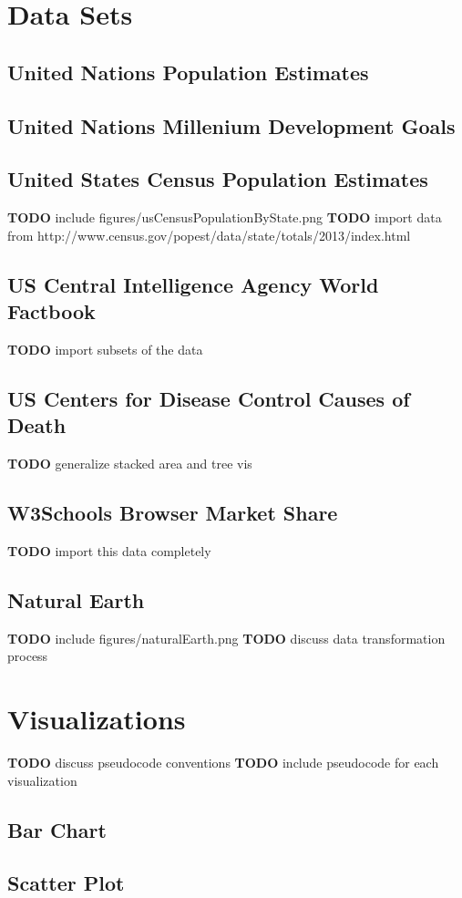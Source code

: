 \documentclass[12pt]{report}
\newcommand{\TODO}[1]{{ \color{red}\textbf{TODO} #1 }}
\begin{document}
\begin{doublespace}
\pagebreak
\section{Data Sets}
\subsection{United Nations Population Estimates}
\subsection{United Nations Millenium Development Goals}
\subsection{United States Census Population Estimates}
\TODO{ include figures/usCensusPopulationByState.png}
\TODO{ import data from http://www.census.gov/popest/data/state/totals/2013/index.html}
\subsection{US Central Intelligence Agency World Factbook}
\TODO{ import subsets of the data}
\subsection{US Centers for Disease Control Causes of Death}
\TODO{ generalize stacked area and tree vis}
\subsection{W3Schools Browser Market Share}
\TODO{ import this data completely}
\subsection{Natural Earth}
\TODO{ include figures/naturalEarth.png}
\TODO{ discuss data transformation process}

\pagebreak
\section{Visualizations}
\TODO{ discuss pseudocode conventions}
\TODO{ include pseudocode for each visualization}
\subsection{Bar Chart}
\subsection{Scatter Plot}

\end{doublespace}
\end{document}
